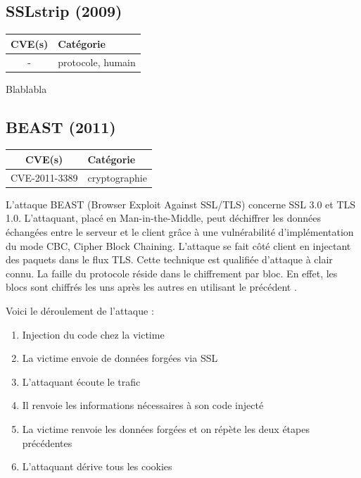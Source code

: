 

\subsection{SSLstrip (2009)}

\begin{tabularx}{0.96\textwidth}{|c|X|}
  \hline
  \textbf{CVE(s)} & \textbf{Catégorie} \\
  \hline
  - & protocole, humain \\
  \hline
\end{tabularx}

\vspace{1em}

Blablabla \cite{sslstrip-website}




\subsection{BEAST (2011)}

\begin{tabularx}{0.96\textwidth}{|c|X|}
  \hline
  \textbf{CVE(s)} & \textbf{Catégorie} \\
  \hline
  CVE-2011-3389 & cryptographie \\
  \hline
\end{tabularx}

\vspace{1em}

L'attaque BEAST (Browser Exploit Against SSL/TLS) concerne SSL 3.0 et TLS 1.0. L'attaquant, placé en Man-in-the-Middle, peut déchiffrer les données échangées entre le serveur et le client grâce à une vulnérabilité d'implémentation du mode CBC, Cipher Block Chaining. L'attaque se fait côté client en injectant des paquets dans le flux TLS. Cette technique est qualifiée d'attaque à clair connu. La faille du protocole réside dans le chiffrement par bloc. En effet, les blocs sont chiffrés les uns après les autres en utilisant le précédent \cite{beast}.

Voici le déroulement de l'attaque :

\begin{enumerate}
\item Injection du code chez la victime
\item La victime envoie de données forgées via SSL
\item L'attaquant écoute le trafic
\item Il renvoie les informations nécessaires à son code injecté
\item La victime renvoie les données forgées et on répète les deux étapes précédentes
  \item L'attaquant dérive tous les cookies
\end{enumerate}

